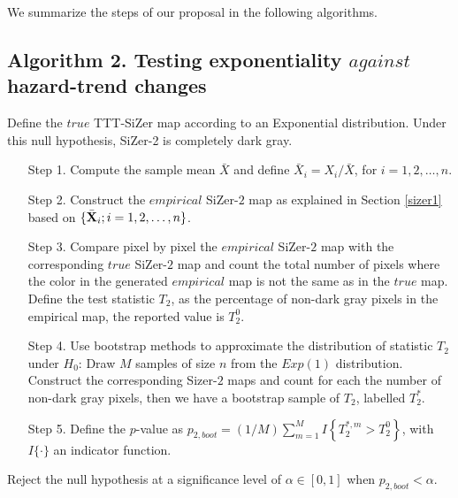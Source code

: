 \documentclass[preprint,12pt]{elsarticle}
\begin{document}
We summarize the steps of our proposal in the following algorithms. 

\subsection*{Algorithm 2. Testing exponentiality $against$ hazard-trend changes} 
Define the $true$ TTT-SiZer map according to an Exponential distribution. Under this null hypothesis, SiZer-2 is completely dark gray. 
\begin{enumerate}
\item[Step 1.] Compute the sample mean $\bar{X}$ and define $\bar{X}_i=X_i/\bar{X}$, for $ i=1,2,\ldots,n$.

\item[Step 2.] Construct the $empirical$ SiZer-$2$ map as explained in Section \ref{sizer1} based on  $\{\bar{\bf X}_i; i=1, 2,\ldots, n \}$.
\item[Step 3.] Compare pixel by pixel the $empirical$ SiZer-$2$ map with the corresponding $true$ SiZer-$2$ map and count the total number of pixels where the color in the generated $empirical$ map is not the same as in the $true$ map. Define the test statistic $T_2$, as the percentage of non-dark gray pixels in the empirical map, the reported value is $T_2^0$.

\item[Step 4.] Use bootstrap methods to approximate the distribution of statistic $T_2$ under $H_0$: Draw $M$ samples of size $n$ from the $Exp(1)$ distribution. Construct the corresponding Sizer-$2$ maps and count for each the number of non-dark gray pixels, then we have a bootstrap sample of $T_2$, labelled $T^{*}_2$.

\item[Step 5.] Define the $p$-value as $p_{2,boot}=(1/M)\sum_{m=1}^M I\left\{T^{*,m}_2 > T_2^0\right\}$, with $I\{\cdot\}$ an indicator function.
\end{enumerate}
Reject the null hypothesis at a significance level of $\alpha \in [0,1]$ when $p_{2,boot} < \alpha$. %


\end{document}
